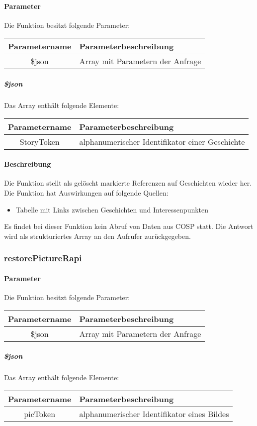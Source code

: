 \paragraph{Parameter} Die Funktion besitzt folgende Parameter:
\begin{table}[H]
	\begin{tabular}{|c|p{11cm}|}
		\hline
		\textbf{Parametername} & \textbf{Parameterbeschreibung} \\ \hline
		\$json & Array mit Parametern der Anfrage \\ \hline
	\end{tabular}
\end{table}
\subparagraph{\$json}Das Array enthält folgende Elemente:
\begin{table}[H]
	\begin{tabular}{|c|p{11cm}|}
		\hline
		\textbf{Parametername} & \textbf{Parameterbeschreibung} \\ \hline
		StoryToken & alphanumerischer Identifikator einer Geschichte \\ \hline
	\end{tabular}
\end{table}
\paragraph{Beschreibung} Die Funktion stellt als gelöscht markierte Referenzen auf Geschichten wieder her. Die Funktion hat Auswirkungen auf folgende Quellen:
\begin{itemize}
	\item Tabelle mit Links zwischen Geschichten und Interessenpunkten
\end{itemize}
Es findet bei dieser Funktion kein Abruf von Daten aus {\glqq COSP\grqq} statt. Die Antwort wird als strukturiertes Array an den Aufrufer zurückgegeben.
\subsubsection{restorePictureRapi}
\paragraph{Parameter} Die Funktion besitzt folgende Parameter:
\begin{table}[H]
	\begin{tabular}{|c|p{11cm}|}
		\hline
		\textbf{Parametername} & \textbf{Parameterbeschreibung} \\ \hline
		\$json & Array mit Parametern der Anfrage \\ \hline
	\end{tabular}
\end{table}
\subparagraph{\$json}Das Array enthält folgende Elemente:
\begin{table}[H]
	\begin{tabular}{|c|p{11cm}|}
		\hline
		\textbf{Parametername} & \textbf{Parameterbeschreibung} \\ \hline
		picToken & alphanumerischer Identifikator eines Bildes \\ \hline
	\end{tabular}
\end{table}
